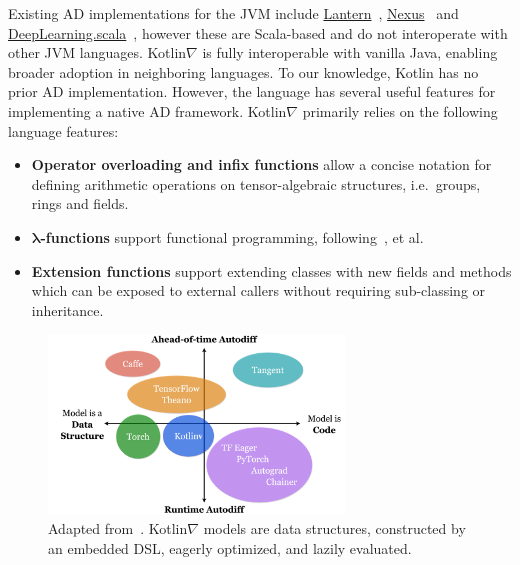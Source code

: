 Existing AD implementations for the JVM include \href{https://feiwang3311.github.io/Lantern/}{Lantern}~\citep{wang2018demystifying}, \href{https://tongfei.me/nexus/}{Nexus}~\citep{chen2017typesafe} and \href{https://github.com/ThoughtWorksInc/DeepLearning.scala}{DeepLearning.scala}~\citep{yang2018dl4s}, however these are Scala-based and do not interoperate with other JVM languages. Kotlin$\nabla$ is fully interoperable with vanilla Java, enabling broader adoption in neighboring languages. To our knowledge, Kotlin has no prior AD implementation. However, the language has several useful features for implementing a native AD framework. Kotlin$\nabla$ primarily relies on the following language features:

\begin{itemize}
    \item \textbf{Operator overloading and infix functions} allow a concise notation for defining arithmetic operations on tensor-algebraic structures, i.e.\ groups, rings and fields.
    \item \textbf{$\mathbf{\lambda}$-functions} support functional programming, following~\citet{pearlmutter2008reverse, pearlmutter2008using, siskind2008nesting, elliott2009beautiful, elliott2018simple}, et al.
    \item \textbf{Extension functions} support extending classes with new fields and methods which can be exposed to external callers without requiring sub-classing or inheritance.
\end{itemize}

\begin{figure}
    \centering
    \includegraphics[width=0.70\textwidth]{../figures/kotlingrad_diagram.png}
    \caption{Adapted from~\citet{van2018tangent}. Kotlin$\nabla$ models are data structures, constructed by an embedded DSL, eagerly optimized, and lazily evaluated.}
    \label{fig:kotlingrad_digram}
\end{figure}

